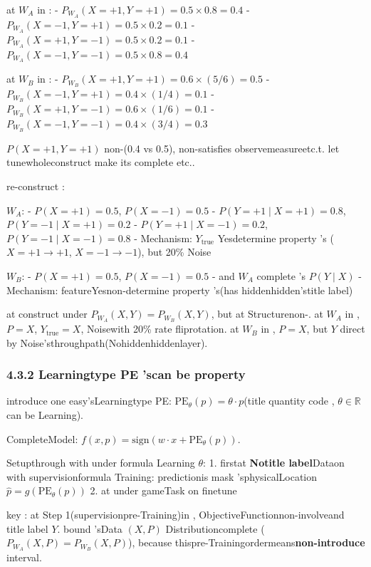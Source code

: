 \documentclass[
  12pt,
]{article}
\begin{document}
at  \(W_A\) in :  - \(P_{W_A}(X = +1, Y = +1) = 0.5 \times 0.8 = 0.4\) -
\(P_{W_A}(X = -1, Y = +1) = 0.5 \times 0.2 = 0.1\) -
\(P_{W_A}(X = +1, Y = -1) = 0.5 \times 0.2 = 0.1\) -
\(P_{W_A}(X = -1, Y = -1) = 0.5 \times 0.8 = 0.4\)

at  \(W_B\) in :  - \(P_{W_B}(X = +1, Y = +1) = 0.6 \times (5/6) = 0.5\) -
\(P_{W_B}(X = -1, Y = +1) = 0.4 \times (1/4) = 0.1\) -
\(P_{W_B}(X = +1, Y = -1) = 0.6 \times (1/6) = 0.1\) -
\(P_{W_B}(X = -1, Y = -1) = 0.4 \times (3/4) = 0.3\)

\(P(X=+1,Y=+1)\) non-(0.4 vs
0.5), non-satisfies observemeasureetc.t. let tunewholeconstruct make its complete etc.. 

re-construct : 

\(W_A\):  - \(P(X=+1) = 0.5\), \(P(X=-1) = 0.5\) -
\(P(Y=+1 \mid X=+1) = 0.8\), \(P(Y=-1 \mid X=+1) = 0.2\) -
\(P(Y=+1 \mid X=-1) = 0.2\), \(P(Y=-1 \mid X=-1) = 0.8\) -
Mechanism: \(Y_{\text{true}}\) Yesdetermine property 's (\(X=+1 \to +1\),
\(X=-1 \to -1\)), but  20\% Noise

\(W_B\):  - \(P(X=+1) = 0.5\), \(P(X=-1) = 0.5\) - and  \(W_A\) complete 's
\(P(Y \mid X)\) - Mechanism: featureYesnon-determine property 's(has hiddenhidden'stitle label)

at construct under  \(P_{W_A}(X, Y) = P_{W_B}(X, Y)\), but at Structurenon-. at  \(W_A\)
in , \(P = X\), \(Y_{\text{true}} = X\), Noisewith  20\% rate fliprotation. at  \(W_B\)
in , \(P = X\), but  \(Y\) direct by Noise'sthroughpath(Nohiddenhiddenlayer). 

\subsubsection{4.3.2 Learningtype  PE
'scan be property }\label{ux5b66ux4e60ux578b-pe-ux7684ux53efux533aux5206ux6027}

introduce one easy'sLearningtype 
PE: \(\text{PE}_\theta(p) = \theta \cdot p\)(title quantity code , \(\theta \in \mathbb{R}\)
can be Learning). 

CompleteModel: \(f(x, p) = \text{sign}(w \cdot x + \text{PE}_\theta(p))\). 

Setupthrough with under formula Learning \(\theta\):  1.
firstat \textbf{Notitle label}Dataon with supervisionformula Training: predictionis  mask 'sphysicalLocation
\(\hat{p} = g(\text{PE}_\theta(p))\) 2. at under gameTask on finetune

key : at Step 1(supervisionpre-Training)in , ObjectiveFunctionnon-involveand title label
\(Y\). bound 'sData \((X, P)\)
Distributioncomplete (\(P_{W_A}(X, P) = P_{W_B}(X, P)\)), because thispre-Trainingordermeans\textbf{non-introduce }interval. 
\end{document}
